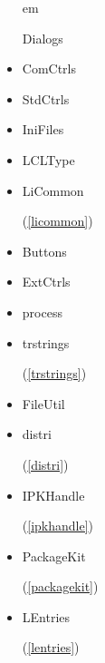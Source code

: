 \documentclass{report}
\begin{document}
\begin{itemize}
em \begin{ttfamily}Dialogs\end{ttfamily}\item \begin{ttfamily}ComCtrls\end{ttfamily}\item \begin{ttfamily}StdCtrls\end{ttfamily}\item \begin{ttfamily}IniFiles\end{ttfamily}\item \begin{ttfamily}LCLType\end{ttfamily}\item \begin{ttfamily}LiCommon\end{ttfamily}(\ref{licommon})\item \begin{ttfamily}Buttons\end{ttfamily}\item \begin{ttfamily}ExtCtrls\end{ttfamily}\item \begin{ttfamily}process\end{ttfamily}\item \begin{ttfamily}trstrings\end{ttfamily}(\ref{trstrings})\item \begin{ttfamily}FileUtil\end{ttfamily}\item \begin{ttfamily}distri\end{ttfamily}(\ref{distri})\item \begin{ttfamily}IPKHandle\end{ttfamily}(\ref{ipkhandle})\item \begin{ttfamily}PackageKit\end{ttfamily}(\ref{packagekit})\item \begin{ttfamily}LEntries\end{ttfamily}(\ref{lentries})\end{itemize}
\end{document}
